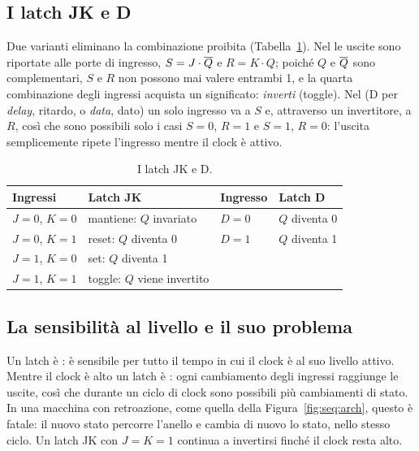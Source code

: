 \subsection{I latch JK e D}

Due varianti eliminano la combinazione proibita (Tabella~\ref{tab:seq:jkd}).
Nel  le uscite sono riportate alle porte di ingresso,
$S=J\cdot\overline{Q}$ e $R=K\cdot Q$; poiché $Q$ e $\overline{Q}$ sono complementari,
$S$ e $R$ non possono mai valere entrambi 1, e la quarta combinazione degli
ingressi acquista un significato: \emph{inverti} (toggle). Nel 
(D per \emph{delay}, ritardo, o \emph{data}, dato) un solo ingresso va a $S$ e,
attraverso un invertitore, a $R$, così che sono possibili solo i casi $S=0$,
$R=1$ e $S=1$, $R=0$: l'uscita semplicemente ripete l'ingresso mentre il clock
è attivo.

\begin{table}[htb]
\centering\small
\caption{I latch JK e D.}\label{tab:seq:jkd}
\begin{tabular}{@{}ll@{\qquad\qquad}ll@{}}
\toprule
\textbf{Ingressi} & \textbf{Latch JK} & \textbf{Ingresso} & \textbf{Latch D}\\
\midrule
$J=0$, $K=0$ & mantiene: $Q$ invariato & $D=0$ & $Q$ diventa 0\\
$J=0$, $K=1$ & reset: $Q$ diventa 0 & $D=1$ & $Q$ diventa 1\\
$J=1$, $K=0$ & set: $Q$ diventa 1 & &\\
$J=1$, $K=1$ & toggle: $Q$ viene invertito & &\\
\bottomrule
\end{tabular}
\end{table}

\subsection{La sensibilità al livello e il suo problema}

Un latch è : è sensibile per tutto il tempo in cui
il clock è al suo livello attivo. Mentre il clock è alto un latch è
: ogni cambiamento degli ingressi raggiunge le uscite, così
che durante un ciclo di clock sono possibili più cambiamenti di stato. In una
macchina con retroazione, come quella della Figura~\ref{fig:seq:arch}, questo è
fatale: il nuovo stato percorre l'anello e cambia di nuovo lo stato, nello
stesso ciclo. Un latch JK con $J=K=1$ continua a invertirsi finché il clock
resta alto.


